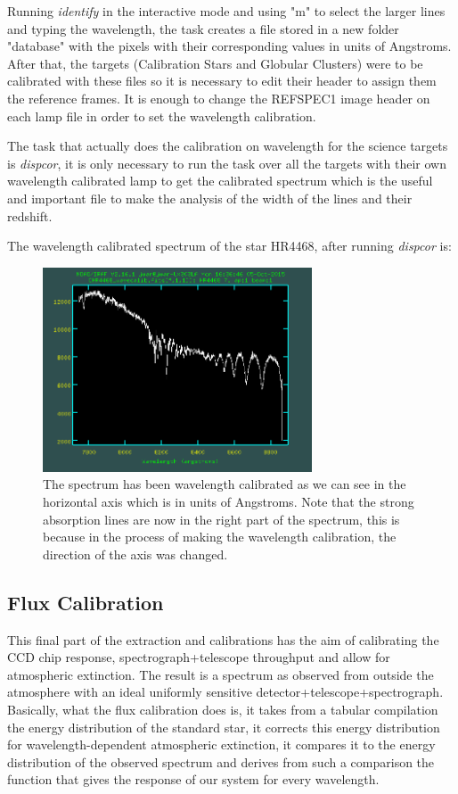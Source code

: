 Running \textit{identify} in the interactive mode and using "m" to select the larger lines and typing the wavelength, the task creates a file stored in a new folder "database" with the pixels with their corresponding values in units of Angstroms. After that, the targets (Calibration Stars and Globular Clusters) were to be calibrated with these files so it is necessary to edit their header to assign them the reference frames. It is enough to change the REFSPEC1 image header on each lamp file in order to set the wavelength calibration. 

The task that actually does the calibration on wavelength for the science targets is \textit{dispcor}, it is only necessary to run the task over all the targets with their own wavelength calibrated lamp to get the calibrated spectrum which is the useful and important file to make the analysis of the width of the lines and their redshift.

The wavelength calibrated spectrum of the star HR4468, after running \textit{dispcor} is:

\begin{figure}[H]
\centering
\includegraphics[width=8cm]{images/calib_star_wave.png}
\caption{The spectrum has been wavelength calibrated as we can see in the horizontal axis which is in units of Angstroms. Note that the strong absorption lines are now in the right part of the spectrum, this is because in the process of making the wavelength calibration, the direction of the axis was changed.}
\end{figure}

\subsection{Flux Calibration}

This final part of the extraction and calibrations has the aim of calibrating the CCD chip response, spectrograph+telescope throughput and allow for atmospheric extinction. The result is a spectrum as observed from outside the atmosphere with an ideal uniformly sensitive detector+telescope+spectrograph. Basically, what the flux calibration does is, it takes from a tabular compilation the energy distribution of the standard star, it corrects this energy distribution for wavelength-dependent atmospheric extinction, it compares it to the energy distribution of the observed spectrum and derives from such a comparison the function that gives the response of our system for every wavelength.

